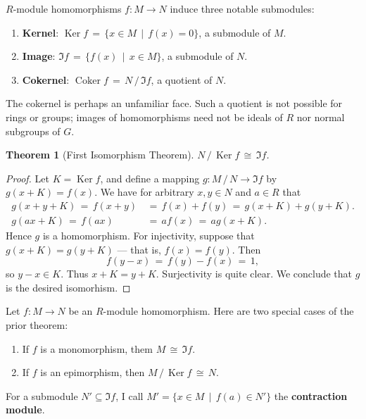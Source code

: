 \documentclass[11pt]{article}
\newtheorem{theorem}{Theorem}
\newcommand{\Ker}{\operatorname{Ker}}
\newcommand{\Coker}{\operatorname{Coker}}
\begin{document}
$R$-module homomorphisms $f : M \to N$ induce three notable submodules: 
\begin{enumerate}
  \item \textbf{Kernel}: $\Ker f \, = \, \{ x \in M \, \mid \, f(x) = 0 \}$, a submodule of $M$.
  \item \textbf{Image}: $\Im f \, = \, \{ f(x) \, \mid \, x \in M \}$, a submodule of $N$.
  \item \textbf{Cokernel}: $\Coker f \, = \, N \, / \, \Im f$, a quotient of $N$.
\end{enumerate}
The cokernel is perhaps an unfamiliar face. Such a quotient is not possible for rings or groups; images of homomorphisms need not be ideals of $R$ nor normal subgroups of $G$. 

\begin{adjustwidth}{0.5cm}{}
  \begin{theorem}[First Isomorphism Theorem]
     $N \, / \, \Ker f \, \cong \, \Im f$.
  \end{theorem}
  \begin{proof}
    Let $K = \Ker f$, and define a mapping $g : M \, / \, N \to \Im f$ by $g(x + K) = f(x)$. We have for arbitrary $x, y \in N$ and $a \in R$ that
    \begin{align*}
      g(x + y + K) \, = \, f(x + y) \, &= \, f(x) + f(y) \, = \, g(x + K) + g(y + K). \\
            g(ax + K) \, = \, f(ax) \, &= \, a f(x) \, = \, a g(x + K).
    \end{align*}
    Hence $g$ is a homomorphism. For injectivity, suppose that $g(x + K) = g(y + K)$ --- that is, $f(x) = f(y)$. Then
    \[
      f(y - x) \, = \, f(y) - f(x) \, = \, 1,
    \]
    so $y - x \in K$. Thus $x + K = y + K$. Surjectivity is quite clear. We conclude that $g$ is the desired isomorhism.
  \end{proof}
\end{adjustwidth}

Let $f : M \to N$ be an $R$-module homomorphism. Here are two special cases of the prior theorem:
\begin{enumerate}
  \item If $f$ is a monomorphism, them $M \, \cong \, \Im f$.
  \item If $f$ is an epimorphism, then $M \, / \, \Ker f \, \cong \, N$.
\end{enumerate}

For a submodule $N' \subseteq \Im f$, I call $M' = \{ x \in M \, \mid \, f(a) \in N' \}$ the \textbf{contraction module}.
\end{document}

